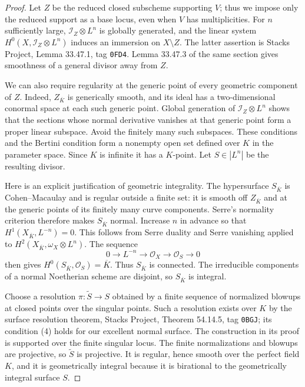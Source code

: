 \documentclass[11pt,a4paper]{article}
\begin{document}
\begin{proof}
Let $Z$ be the reduced closed subscheme supporting $V$; thus we impose
only the reduced support as a base locus, even when $V$ has
multiplicities.  For $n$ sufficiently large,
$\mathcal I_Z\otimes L^n$ is globally generated, and the linear system
$H^0(X,\mathcal I_Z\otimes L^n)$ induces an immersion on $X\setminus Z$.
The latter assertion is Stacks Project, Lemma 33.47.1, tag
\texttt{0FD4}.  Lemma 33.47.3 of the same section gives smoothness of a
general divisor away from $Z$.

We can also require regularity at the generic point of every geometric
component of $Z$.  Indeed, $Z_{\overline K}$ is generically smooth, and
its ideal has a two-dimensional conormal space at each such generic
point.  Global generation of $\mathcal I_Z\otimes L^n$ shows that the
sections whose normal derivative vanishes at that generic point form
a proper linear subspace.  Avoid the finitely many such subspaces.
These conditions and the Bertini condition form a nonempty open set
defined over $K$ in the parameter space.  Since $K$ is infinite it has
a $K$-point.  Let $S\in|L^n|$ be the resulting divisor.

Here is an explicit justification of geometric integrality.  The
hypersurface $S_{\overline K}$ is Cohen--Macaulay and is regular outside
a finite set: it is smooth off $Z_{\overline K}$ and at the generic
points of its finitely many curve components.  Serre's normality
criterion therefore makes $S_{\overline K}$ normal.  Increase $n$ in
advance so that $H^1(X_{\overline K},L^{-n})=0$.  This follows from
Serre duality and Serre vanishing applied to
$H^2(X_{\overline K},\omega_X\otimes L^n)$.  The sequence
\[
 0\longrightarrow L^{-n}\longrightarrow\mathcal O_X
 \longrightarrow\mathcal O_S\longrightarrow0
\]
then gives $H^0(S_{\overline K},\mathcal O_S)=\overline K$.
Thus $S_{\overline K}$ is connected.  The irreducible components of a
normal Noetherian scheme are disjoint, so $S_{\overline K}$ is integral.

Choose a resolution $\pi:\widetilde S\to S$ obtained by a finite
sequence of normalized blowups at closed points over the singular
points.  Such a resolution exists over $K$ by the surface resolution
theorem, Stacks Project, Theorem 54.14.5, tag \texttt{0BGJ}; its
condition (4) holds for our excellent normal surface.  The
construction in its proof is supported over the finite singular
locus.  The finite normalizations and blowups are projective, so
$\widetilde S$ is projective.  It is regular, hence smooth over the
perfect field $K$, and it is geometrically integral because it is
birational to the geometrically integral surface $S$.


\end{proof}
\end{document}
